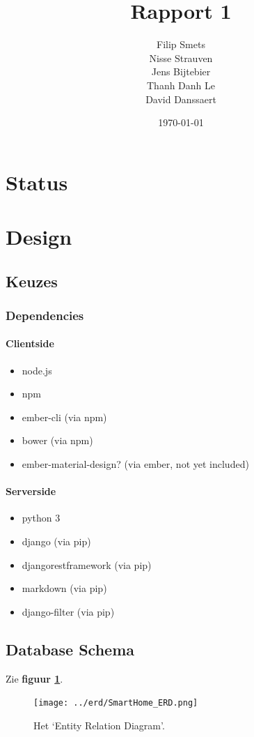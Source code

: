 \documentclass[11pt]{article}
\title{\textbf{Rapport 1}}
\author{Filip Smets\\
		Nisse Strauven\\
		Jens Bijtebier\\
		Thanh Danh Le\\
		David Danssaert}
\date{\today}
\begin{document}
\maketitle

\tableofcontents

\section{Status}
\section{Design}
  \subsection{Keuzes}
  \subsubsection{Dependencies}
  \paragraph{Clientside}
  \begin{itemize}
  \item node.js
  \item npm
  \item ember-cli (via npm)
  \item bower (via npm)
  \item ember-material-design? (via ember, not yet included)
  \end{itemize}

  \paragraph{Serverside}
  \begin{itemize}
  \item python 3
  \item django (via pip)
  \item djangorestframework (via pip)
  \item markdown (via pip)
  \item django-filter (via pip)
  \end{itemize}
  \subsection{Database Schema}
  Zie \textbf{figuur \ref{fig:erd}}.
  \begin{figure}[H]
  \centering
    \texttt{[image: ../erd/SmartHome\_ERD.png]}
  \caption{Het `Entity Relation Diagram'.}
  \label{fig:erd}
  \end{figure}
  
\end{document}

